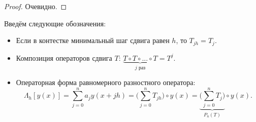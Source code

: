 \documentclass[../main.tex]{subfile}
\begin{document}
\begin{proof}
	Очевидно.
\end{proof}

\begin{define}
	Введём следующие обозначения:
	\begin{itemize}[nosep]
		\item Если в контестке минимальный шаг сдвига равен $h$, то
			$T_{jh}=T_j$.
		\item Композиция операторов сдвига $T$: $\underset{j\text{ раз}}
			{\underbrace{T\circ T\circ...\circ T}}=T^j$.
		\item Операторная форма равномерного разностного оператора:
			\[\Lambda_h[y(x)]=\sum_{j=0}^{n}a_jy(x+jh)=\Big(\sum_
			{j=0}^{n}T_{jh}\Big)\circ y(x)=\underset{P_n(T)}
			{\underbrace{\Big(\sum_{j=0}^{n}T_j\Big)}}\circ y(x).\]
	\end{itemize}
\end{define}
\end{document}
